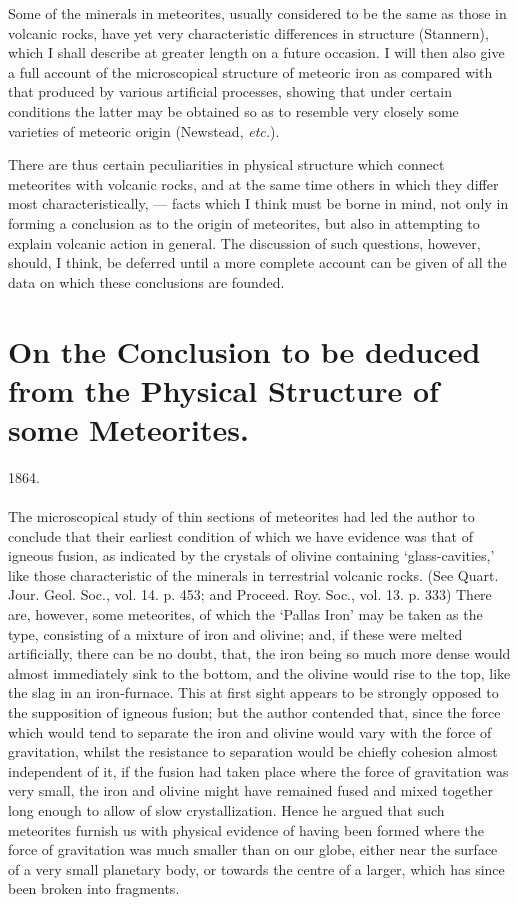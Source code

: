 \documentclass[a4paper, 12pt, oneside]{article}
\begin{document}
Some of the minerals in meteorites, usually considered to be the same as those in volcanic rocks, have yet very characteristic differences in structure (Stannern), which I shall describe at greater length on a future occasion. I will then also give a full account of the microscopical structure of meteoric iron as compared with that produced by various artificial processes, showing that under certain conditions the latter may be obtained so as to resemble very closely some varieties of meteoric origin (Newstead, \emph{etc.}).

There are thus certain peculiarities in physical structure which connect meteorites with volcanic rocks, and at the same time others in which they differ most characteristically, --- facts which I think must be borne in mind, not only in forming a conclusion as to the origin of meteorites, but also in attempting to explain volcanic action in general. The discussion of such questions, however, should, I think, be deferred until a more complete account can be given of all the data on which these conclusions are founded.
\clearpage
\section{On the Conclusion to be deduced from the Physical Structure of some Meteorites.}
\begin{center}
1864.
\end{center}
\paragraph{}
The microscopical study of thin sections of meteorites had led the author to conclude that their earliest condition of which we have evidence was that of igneous fusion, as indicated by the crystals of olivine containing `glass-cavities,' like those characteristic of the minerals in terrestrial volcanic rocks. (See Quart. Jour. Geol. Soc., vol. 14. p. 453; and Proceed. Roy. Soc., vol. 13. p. 333) There are, however, some meteorites, of which the `Pallas Iron' may be taken as the type, consisting of a mixture of iron and olivine; and, if these were melted artificially, there can be no doubt, that, the iron being so much more dense would almost immediately sink to the bottom, and the olivine would rise to the top, like the slag in an iron-furnace. This at first sight appears to be strongly opposed to the supposition of igneous fusion; but the author contended that, since the force which would tend to separate the iron and olivine would vary with the force of gravitation, whilst the resistance to separation would be chiefly cohesion almost independent of it, if the fusion had taken place where the force of gravitation was very small, the iron and olivine might have remained fused and mixed together long enough to allow of slow crystallization. Hence he argued that such meteorites furnish us with physical evidence of having been formed where the force of gravitation was much smaller than on our globe, either near the surface of a very small planetary body, or towards the centre of a larger, which has since been broken into fragments.
\clearpage
\end{document}

